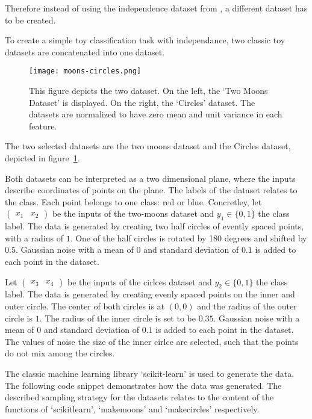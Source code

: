 Therefore instead of using the independence dataset from \autocite{BIMT}, a different dataset has to be created.

To create a simple toy classification task with independance, two classic toy datasets are concatenated into one dataset.

\begin{figure}[ht]
    \centering
    \texttt{[image: moons-circles.png]}
    \caption{
        This figure depicts the two dataset. 
        On the left, the `Two Moons Dataset' is displayed. 
        On the right, the `Circles' dataset. 
        The datasets are normalized to have zero mean and unit variance in each feature.
    }\label{fig:moons_circles}
\end{figure}

The two selected datasets are the two moons dataset and the Circles dataset, depicted in figure~\ref{fig:moons_circles}.

Both datasets can be interpreted as a two dimensional plane, where the inputs describe coordinates of points on the plane. 
The labels of the dataset relates to the class.
Each point belongs to one class: red or blue.
Concretley, let $\begin{pmatrix} x_1 & x_2 \end{pmatrix}$ be the inputs of the two-moons dataset and $y_1 \in \{0,1\}$ the class label.
The data is generated by creating two half circles of evently spaced points, with a radius of $1$.
One of the half circles is rotated by 180 degrees and shifted by $0.5$.
Gaussian noise with a mean of $0$ and standard deviation of $0.1$ is added to each point in the dataset.

Let $\begin{pmatrix} x_3 & x_4 \end{pmatrix}$ be the inputs of the cirlces dataset and $y_2 \in \{0,1\}$ the class label.
The data is generated by creating evenly spaced points on the inner and outer circle. 
The center of both circles is at $(0,0)$ and the radius of the outer circle is $1$.
The radius of the inner circle is set to be $0.35$.
Gaussian noise with a mean of $0$ and standard deviation of $0.1$ is added to each point in the dataset.
The values of noise the size of the inner cirlce are selected, such that the points do not mix among the circles.

The classic machine learning library `scikit-learn' is used to generate the data. 
The following code snippet demonstrates how the data was generated.
The described sampling strategy for the datasets relates to the content of the functions of `scikitlearn', `makemoons' and `makecircles' respectively.

